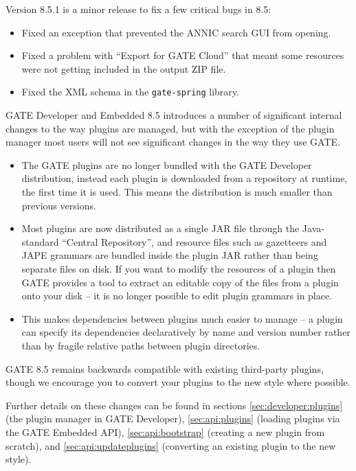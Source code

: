 
Version 8.5.1 is a minor release to fix a few critical bugs in 8.5:

\begin{itemize}
\item Fixed an exception that prevented the ANNIC search GUI from opening.
\item Fixed a problem with ``Export for GATE Cloud'' that meant some resources
  were not getting included in the output ZIP file.
\item Fixed the XML schema in the \verb!gate-spring! library.
\end{itemize}


GATE Developer and Embedded 8.5 introduces a number of significant internal
changes to the way plugins are managed, but with the exception of the plugin
manager most users will not see significant changes in the way they use GATE.

\begin{itemize}
\item The GATE plugins are no longer bundled with the GATE Developer
  distribution, instead each plugin is downloaded from a repository at runtime,
  the first time it is used.  This means the distribution is much smaller than
  previous versions.
\item Most plugins are now distributed as a single JAR file through the
  Java-standard ``Central Repository'', and resource files such as gazetteers
  and JAPE grammars are bundled inside the plugin JAR rather than being
  separate files on disk.  If you want to modify the resources of a plugin
  then GATE provides a tool to extract an editable copy of the files from
  a plugin onto your disk -- it is no longer possible to edit plugin grammars
  in place.
\item This makes dependencies between plugins much easier to manage -- a plugin
  can specify its dependencies declaratively by name and version number rather
  than by fragile relative paths between plugin directories.
\end{itemize}

GATE 8.5 remains backwards compatible with existing third-party plugins, though
we encourage you to convert your plugins to the new style where possible.

Further details on these changes can be found in sections
\ref{sec:developer:plugins} (the plugin manager in GATE Developer),
\ref{sec:api:plugins} (loading plugins via the GATE Embedded API),
\ref{sec:api:bootstrap} (creating a new plugin from scratch), and
\ref{sec:api:updateplugins} (converting an existing plugin to the new style).

